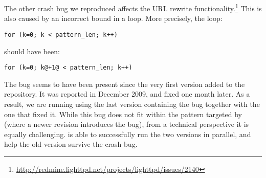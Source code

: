 The other crash bug we
reproduced
affects the URL rewrite functionality.\footnote{\url{http://redmine.lighttpd.net/projects/lighttpd/issues/2140}}
This is also caused by an incorrect bound in a  loop.
More precisely, the loop: 

\begin{lstlisting}[numbers=none,breaklines=true,xleftmargin=0pt]
for (k=0; k < pattern_len; k++)
\end{lstlisting}

\noindent should have been:

\begin{lstlisting}[numbers=none,breaklines=true,xleftmargin=0pt]
for (k=0; k@+1@ < pattern_len; k++)
\end{lstlisting}

The bug seems to have been present since the very first version
added to the repository.  It was reported in December 2009, and
fixed one month later.  As a result, we are running \mx using the last
version containing the bug together with the one that fixed it.  While
this bug does not fit within the pattern targeted by \mx (where a
newer revision introduces the bug), from a technical perspective it is
equally challenging.  \mx is able to successfully run the two versions
in parallel, and help the old version survive the crash bug.

